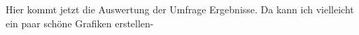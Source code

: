 \documentclass[../main.tex]{subfiles}
\begin{document}
Hier kommt jetzt die Auswertung der Umfrage Ergebnisse. Da kann ich vielleicht ein paar schöne Grafiken erstellen-
\end{document}
